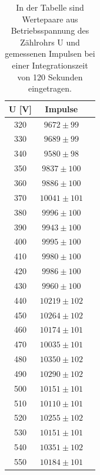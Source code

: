 \documentclass[titlepage = firstcover]{scrartcl}
\begin{document}
            
            \newpage
            \begin{table}[h]
                \centering
                \caption{In der Tabelle sind Wertepaare aus Betriebsspannung des Zählrohrs U und gemessenen Impulsen bei einer Integrationszeit von 120 Sekunden eingetragen.}
                \label{tab:Kennwerte}
                \begin{tabular}{c c c }
                    \toprule
                    {U [V]} & {Impulse} \\
                    \midrule
                    320 &	$9672   \pm 99 $ \\
                    330 &	$9689   \pm 99 $ \\
                    340 &	$9580   \pm 98 $ \\
                    350 &	$9837   \pm 100$ \\
                    360 &	$9886   \pm 100$ \\
                    370 &	$10041  \pm 101$ \\
                    380 &	$9996   \pm 100$ \\
                    390 &	$9943   \pm 100$ \\
                    400 &	$9995   \pm 100$ \\
                    410 &	$9980   \pm 100$ \\
                    420 &	$9986   \pm 100$ \\
                    430 &	$9960   \pm 100$ \\
                    440 &	$10219  \pm 102$ \\
                    450 &	$10264  \pm 102$ \\
                    460 &	$10174  \pm 101$ \\
                    470 &	$10035  \pm 101$ \\
                    480 &	$10350  \pm 102$ \\
                    490 &	$10290  \pm 102$ \\
                    500 &	$10151  \pm 101$ \\
                    510 &	$10110  \pm 101$ \\
                    520 &	$10255  \pm 102$ \\
                    530 &	$10151  \pm 101$ \\
                    540 &	$10351  \pm 102$ \\
                    550 &	$10184  \pm 101$ \\

\end{tabular}
\end{table}
\end{document}
